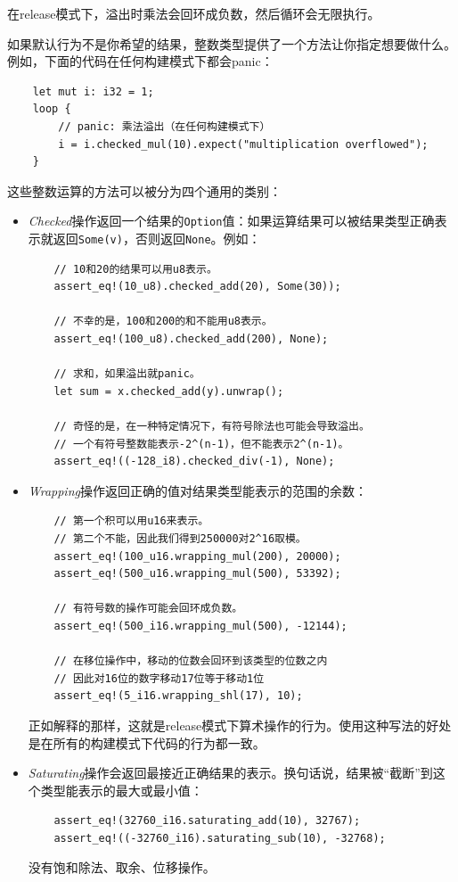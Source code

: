在release模式下，溢出时乘法会回环成负数，然后循环会无限执行。

如果默认行为不是你希望的结果，整数类型提供了一个方法让你指定想要做什么。例如，下面的代码在任何构建模式下都会panic：
\begin{verbatim}
    let mut i: i32 = 1;
    loop {
        // panic: 乘法溢出（在任何构建模式下）
        i = i.checked_mul(10).expect("multiplication overflowed");
    }
\end{verbatim}

这些整数运算的方法可以被分为四个通用的类别：
\begin{itemize}
    \item \emph{Checked}操作返回一个结果的\texttt{Option}值：如果运算结果可以被结果类型正确表示就返回\texttt{Some(v)}，否则返回\texttt{None}。例如：
    \begin{verbatim}
    // 10和20的结果可以用u8表示。
    assert_eq!(10_u8).checked_add(20), Some(30));

    // 不幸的是，100和200的和不能用u8表示。
    assert_eq!(100_u8).checked_add(200), None);

    // 求和，如果溢出就panic。
    let sum = x.checked_add(y).unwrap();

    // 奇怪的是，在一种特定情况下，有符号除法也可能会导致溢出。
    // 一个有符号整数能表示-2^(n-1)，但不能表示2^(n-1)。
    assert_eq!((-128_i8).checked_div(-1), None);
    \end{verbatim}

    \item \emph{Wrapping}操作返回正确的值对结果类型能表示的范围的余数：
    \begin{verbatim}
    // 第一个积可以用u16来表示。
    // 第二个不能，因此我们得到250000对2^16取模。
    assert_eq!(100_u16.wrapping_mul(200), 20000);
    assert_eq!(500_u16.wrapping_mul(500), 53392);

    // 有符号数的操作可能会回环成负数。
    assert_eq!(500_i16.wrapping_mul(500), -12144);

    // 在移位操作中，移动的位数会回环到该类型的位数之内
    // 因此对16位的数字移动17位等于移动1位
    assert_eq!(5_i16.wrapping_shl(17), 10);
    \end{verbatim}
    正如解释的那样，这就是release模式下算术操作的行为。使用这种写法的好处是在所有的构建模式下代码的行为都一致。

    \item \emph{Saturating}操作会返回最接近正确结果的表示。换句话说，结果被“截断”到这个类型能表示的最大或最小值：
    \begin{verbatim}
    assert_eq!(32760_i16.saturating_add(10), 32767);
    assert_eq!((-32760_i16).saturating_sub(10), -32768);
    \end{verbatim}
    没有饱和除法、取余、位移操作。


\end{itemize}
